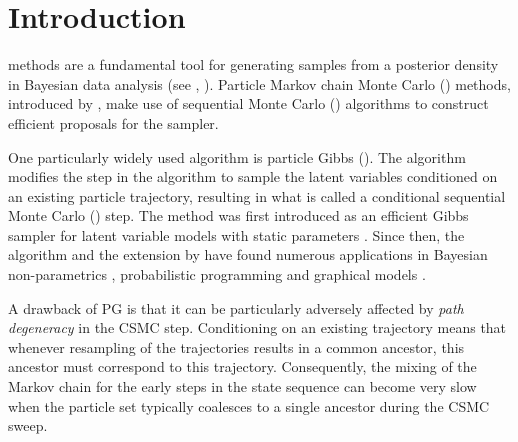 
\section{Introduction}
\label{sec:ipmcmc:intro}

\mcmc methods are a fundamental tool for generating samples from a posterior density in Bayesian data analysis (see \eg, \citet{robert2013monte}). Particle Markov chain Monte Carlo (\pmcmc) methods, introduced by \citet{andrieuDH2010}, make use of sequential Monte Carlo (\smc) algorithms \citep{gordon1993novel,doucet2001sequential} to construct efficient proposals for the \mcmc sampler. 

One particularly widely used \pmcmc algorithm is particle Gibbs (\pg). The \pg algorithm modifies the \smc step in the \pmcmc algorithm to sample the latent variables conditioned on an existing particle trajectory, resulting in what is called a conditional sequential Monte Carlo (\csmc) step. The \pg method was first introduced as an efficient Gibbs sampler for latent variable models with static parameters \citep{andrieuDH2010}. Since then, the \pg algorithm and the extension by \citet{lindstenJS2014} have found numerous applications in \eg Bayesian non-parametrics \citep{ValeraFSPC2015,tripuraneni2015}, probabilistic programming \citep{wood2014new,vandemeent_aistats_2015} and graphical models \citep{everitt2012,naessethLS2014,naessethLS2015nested}.  

A drawback of PG is that it can be particularly adversely affected by \emph{path degeneracy} in the CSMC step.  Conditioning on an existing trajectory means that whenever resampling of the trajectories results in a common ancestor, this ancestor must correspond to this trajectory.  Consequently, the mixing of the Markov chain for the early steps in the state sequence can become very slow when the particle set typically coalesces to a single ancestor during the CSMC sweep.

